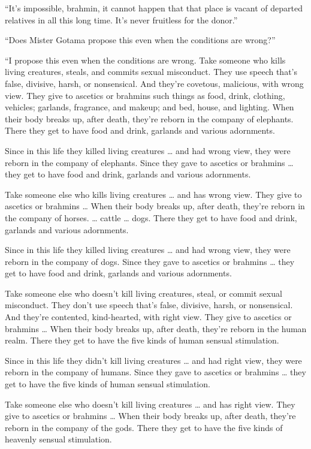 \documentclass[12pt,openany]{book}%
\begin{document}
“It’s impossible, brahmin, it cannot happen that that place is vacant of departed relatives in all this long time. It’s never fruitless for the donor.” 

“Does Mister Gotama propose this even when the conditions are wrong?” 

“I propose this even when the conditions are wrong. Take someone who kills living creatures, steals, and commits sexual misconduct. They use speech that’s false, divisive, harsh, or nonsensical. And they’re covetous, malicious, with wrong view. They give to ascetics or brahmins such things as food, drink, clothing, vehicles; garlands, fragrance, and makeup; and bed, house, and lighting. When their body breaks up, after death, they’re reborn in the company of elephants. There they get to have food and drink, garlands and various adornments. 

Since in this life they killed living creatures … and had wrong view, they were reborn in the company of elephants. Since they gave to ascetics or brahmins … they get to have food and drink, garlands and various adornments. 

Take someone else who kills living creatures … and has wrong view. They give to ascetics or brahmins … When their body breaks up, after death, they’re reborn in the company of horses. … cattle … dogs. There they get to have food and drink, garlands and various adornments. 

Since in this life they killed living creatures … and had wrong view, they were reborn in the company of dogs. Since they gave to ascetics or brahmins … they get to have food and drink, garlands and various adornments. 

Take someone else who doesn’t kill living creatures, steal, or commit sexual misconduct. They don’t use speech that’s false, divisive, harsh, or nonsensical. And they’re contented, kind-hearted, with right view. They give to ascetics or brahmins … When their body breaks up, after death, they’re reborn in the human realm. There they get to have the five kinds of human sensual stimulation. 

Since in this life they didn’t kill living creatures … and had right view, they were reborn in the company of humans. Since they gave to ascetics or brahmins … they get to have the five kinds of human sensual stimulation. 

Take someone else who doesn’t kill living creatures … and has right view. They give to ascetics or brahmins … When their body breaks up, after death, they’re reborn in the company of the gods. There they get to have the five kinds of heavenly sensual stimulation. 
\end{document}
